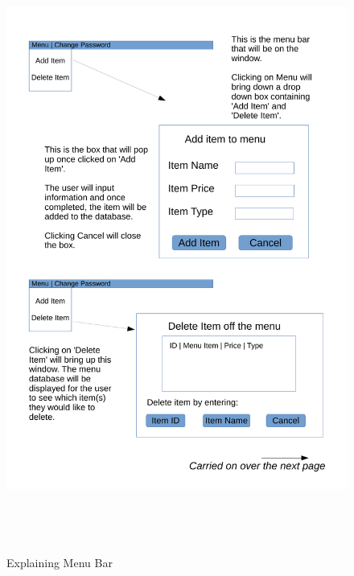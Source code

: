 \begin{figure}[H]
    \includegraphics[height = 20cm]{./Design/Images/InterfaceMenuBar}
    \caption{Explaining Menu Bar} \label{fig:MenuBar}
\end{figure}

